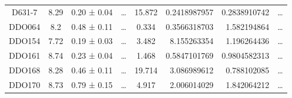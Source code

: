 \documentclass[reprint,%
 amsmath,amssymb,
 aps,
]{revtex4-1}
\begin{document}
\begin{table}[]
\begin{tabular}{cccccrrc}
\rowcolor[HTML]{F3F3F3} 
D631-7               & 8.29                      & 0.20 ± 0.04           & …                      & 15.872                                                       & 0.2418987957                                                          & 0.2838910742                                                          & …                                                             \\
\rowcolor[HTML]{F3F3F3} 
DDO064               & 8.2                       & 0.48 ± 0.11           & …                      & 0.334                                                        & 0.3566318703                                                          & 1.582194864                                                           & …                                                             \\
\rowcolor[HTML]{F3F3F3} 
DDO154               & 7.72                      & 0.19 ± 0.03           & …                      & 3.482                                                        & 8.155263354                                                           & 1.196264436                                                           & …                                                             \\
\rowcolor[HTML]{F3F3F3} 
DDO161               & 8.74                      & 0.23 ± 0.04           & …                      & 1.468                                                        & 0.5847101769                                                          & 0.9804582313                                                          & …                                                             \\
\rowcolor[HTML]{F3F3F3} 
DDO168               & 8.28                      & 0.46 ± 0.11           & …                      & 19.714                                                       & 3.086989612                                                           & 0.788102085                                                           & …                                                             \\
\rowcolor[HTML]{F3F3F3} 
DDO170               & 8.73                      & 0.79 ± 0.15           & …                      & 4.917                                                        & 2.006014029                                                           & 1.842064212                                                           & …                                                             \\

\end{tabular}
\end{table}
\end{document}
